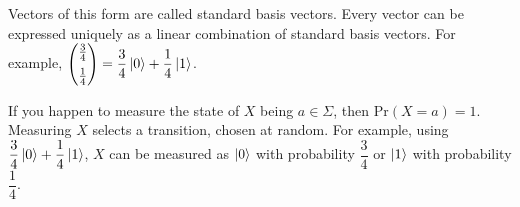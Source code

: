\documentclass{report}
\begin{document}

\begin{note}
Vectors of this form are called standard basis vectors. Every vector can be expressed uniquely as a linear combination of standard basis vectors. For example,
$\begin{pmatrix}
\frac{3}{4} \\[0.5em]
\frac{1}{4}
\end{pmatrix}
=\dfrac{3}{4}\ket{0}+\dfrac{1}{4}\ket{1}$.
\end{note}

If you happen to measure the state of $X$ being $a\in\Sigma$, then Pr$(X=a)=1$. Measuring $X$ selects a transition, chosen at random. For example, using $\dfrac{3}{4}\ket{0}+\dfrac{1}{4}\ket{1}$, $X$ can be measured as $\ket{0}$ with probability $\dfrac{3}{4}$ or $\ket{1}$ with probability $\dfrac{1}{4}$.
\end{document}
